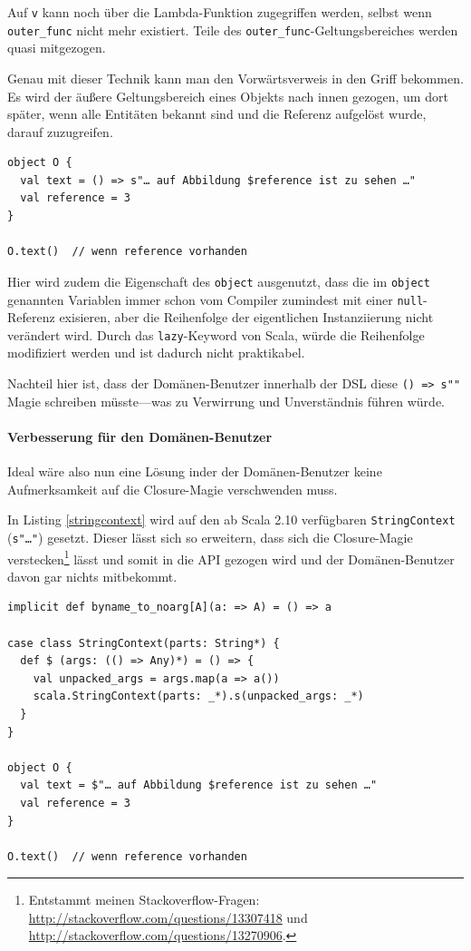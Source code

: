 Auf \lstinline|v| kann noch über die Lambda-Funktion zugegriffen werden,
selbst wenn \lstinline|outer_func| nicht mehr existiert. Teile des
\lstinline|outer_func|-Geltungsbereiches werden quasi mitgezogen.

Genau mit dieser Technik kann man den Vorwärtsverweis in den Griff bekommen.
Es wird der äußere Geltungsbereich eines Objekts nach innen gezogen,
um dort später, wenn alle Entitäten bekannt sind und die Referenz aufgelöst
wurde, darauf zuzugreifen.

\begin{lstlisting}
object O {
  val text = () => s"… auf Abbildung $reference ist zu sehen …"
  val reference = 3
}

O.text()  // wenn reference vorhanden
\end{lstlisting}

Hier wird zudem die Eigenschaft des \lstinline|object| ausgenutzt,
dass die im \lstinline|object| genannten Variablen immer schon vom Compiler
zumindest mit einer \lstinline|null|-Referenz exisieren, aber die Reihenfolge
der eigentlichen Instanziierung nicht verändert wird. Durch das
\lstinline|lazy|-Keyword von Scala, würde die Reihenfolge modifiziert werden
und ist dadurch nicht praktikabel.

Nachteil hier ist, dass der Domänen-Benutzer innerhalb der DSL diese
\lstinline|() => s""| Magie schreiben müsste---was zu Verwirrung und
Unverständnis führen würde.


\paragraph{Verbesserung für den Domänen-Benutzer}

Ideal wäre also nun eine Lösung inder der Domänen-Benutzer keine
Aufmerksamkeit auf die Closure-Magie verschwenden muss.

In Listing \ref{stringcontext} wird auf den ab Scala 2.10 verfügbaren
\lstinline|StringContext| (\lstinline|s"…"|)
gesetzt. \cite{scala-stringInterpolation}
Dieser lässt sich so erweitern, dass
sich die Closure-Magie verstecken\footnote{Entstammt meinen
Stackoverflow-Fragen: \url{http://stackoverflow.com/questions/13307418} und
\url{http://stackoverflow.com/questions/13270906}.} lässt und somit in die API
gezogen wird und der Domänen-Benutzer davon gar nichts mitbekommt.

\begin{lstlisting}[label=stringcontext,caption=Erweiterter StringContext]
implicit def byname_to_noarg[A](a: => A) = () => a

case class StringContext(parts: String*) {
  def $ (args: (() => Any)*) = () => {
    val unpacked_args = args.map(a => a())
    scala.StringContext(parts: _*).s(unpacked_args: _*)
  }
}

object O {
  val text = $"… auf Abbildung $reference ist zu sehen …"
  val reference = 3
}

O.text()  // wenn reference vorhanden
\end{lstlisting}

